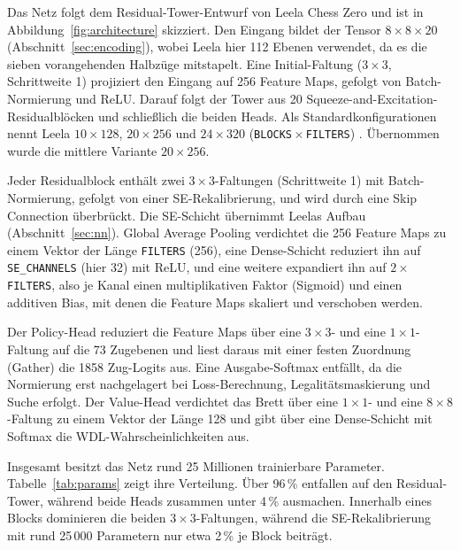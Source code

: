 \documentclass[
  a4paper, 12pt,
  parskip=half,
  headings=small,
  bibliography=totoc
]{scrartcl}
\begin{document}
Das Netz folgt dem Residual-Tower-Entwurf von Leela Chess Zero
\parencite{lczero_nn, klein2022neural} und ist in Abbildung~\ref{fig:architecture}
skizziert. Den Eingang bildet der Tensor \(8\times8\times20\)
(Abschnitt~\ref{sec:encoding}), wobei Leela hier 112 Ebenen verwendet, da es
die sieben vorangehenden Halbzüge mitstapelt. Eine Initial-Faltung
(\(3\times3\), Schrittweite 1) projiziert den Eingang auf 256 Feature Maps,
gefolgt von Batch-Normierung und ReLU. Darauf folgt der Tower aus 20
Squeeze-and-Excitation-Residualblöcken und schließlich die beiden Heads. Als
Standardkonfigurationen nennt Leela \(10\times128\), \(20\times256\) und
\(24\times320\) (\texttt{BLOCKS}\,\(\times\)\,\texttt{FILTERS})
\parencite{lczero_nn}. Übernommen wurde die mittlere Variante \(20\times256\).

Jeder Residualblock enthält zwei \(3\times3\)-Faltungen (Schrittweite 1) mit
Batch-Normierung, gefolgt von einer SE-Rekalibrierung, und wird durch eine
Skip Connection überbrückt. Die SE-Schicht übernimmt Leelas Aufbau
(Abschnitt~\ref{sec:nn}). Global Average Pooling verdichtet die 256
Feature Maps zu einem Vektor der Länge \texttt{FILTERS} (256), eine
Dense-Schicht reduziert ihn auf \texttt{SE\_CHANNELS} (hier 32) mit ReLU, und eine
weitere expandiert ihn auf \(2\times\)\texttt{FILTERS}, also je Kanal einen
multiplikativen Faktor (Sigmoid) und einen additiven Bias, mit denen die
Feature Maps skaliert und verschoben werden.

Der Policy-Head reduziert die Feature Maps über eine \(3\times3\)- und eine
\(1\times1\)-Faltung auf die 73 Zugebenen und liest daraus mit einer festen
Zuordnung (Gather) die 1858 Zug-Logits aus. Eine Ausgabe-Softmax entfällt, da die
Normierung erst nachgelagert bei Loss-Berechnung, Legalitätsmaskierung und Suche
erfolgt. Der Value-Head verdichtet das Brett über eine \(1\times1\)- und eine
\(8\times8\)-Faltung zu einem Vektor der Länge 128 und gibt über eine
Dense-Schicht mit Softmax die WDL-Wahrscheinlichkeiten aus.

Insgesamt besitzt das Netz rund 25 Millionen trainierbare Parameter.
Tabelle~\ref{tab:params} zeigt ihre Verteilung. Über 96\,\% entfallen auf den
Residual-Tower, während beide Heads zusammen unter 4\,\% ausmachen. Innerhalb eines
Blocks dominieren die beiden \(3\times3\)-Faltungen, während die SE-Rekalibrierung
mit rund 25\,000 Parametern nur etwa 2\,\% je Block beiträgt.
\end{document}
